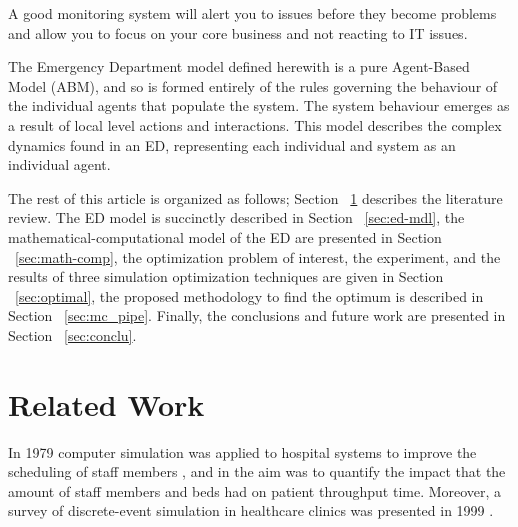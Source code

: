 \documentclass[11pt]{article} %
\begin{document}
A good monitoring system will alert you to issues before they become problems and allow you to focus on your core business and not reacting to IT issues. 

The Emergency Department model defined herewith is a pure Agent-Based Model (ABM), and so is formed entirely of the rules 
governing the behaviour of the individual agents that populate the system. The system behaviour emerges as a result of local level 
actions and interactions. This model describes the complex dynamics found in an ED, representing each individual and system as 
an individual agent. 

The rest of this article is organized as follows; Section ~\ref{sec:review} describes the literature review. The ED model is succinctly 
described in Section ~\ref{sec:ed-mdl}, the mathematical-computational model of the ED are presented in Section ~\ref{sec:math-comp}, the optimization problem of interest, the experiment, and the results of three simulation optimization techniques are given in 
Section ~\ref{sec:optimal}, the proposed methodology to find the optimum is described in Section ~\ref{sec:mc_pipe}. Finally,  the 
conclusions and future work  are presented in Section ~\ref{sec:conclu}.

\section{Related Work}
\label{sec:review}

In 1979 computer simulation was applied to hospital systems to improve the scheduling of staff members \cite{Hancock:1979p28}, 
and in \cite{Saunders:1989p134} the aim was to quantify the impact that the amount of staff members and beds had on patient 
throughput time. Moreover, a survey  of discrete-event simulation in healthcare clinics was presented in 1999 
\cite{Jacobson:1999p109}.
\end{document}
